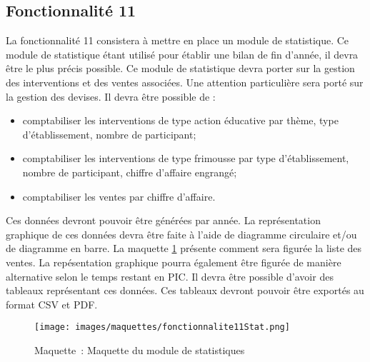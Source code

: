 
\subsection{Fonctionnalité 11}

La fonctionnalité 11 consistera à mettre en place un module de statistique. Ce module de statistique étant utilisé pour établir une bilan de fin d'année, il devra être le plus précis possible.
Ce module de statistique devra porter sur la gestion des interventions et des ventes associées.
Une attention particulière sera porté sur la gestion des devises.
Il devra être possible de :
\begin{itemize}
\item comptabiliser les interventions de type action éducative par thème, type d'établissement, nombre de participant;
\item comptabiliser les interventions de type frimousse par type d'établissement, nombre de participant, chiffre d'affaire engrangé;
\item comptabiliser les ventes par chiffre d'affaire.
\end{itemize}
Ces données devront pouvoir être générées par année. La représentation graphique de ces données devra être faite à l'aide de diagramme circulaire et/ou de diagramme en barre. La maquette \ref{fonctionnalite11Stat} présente comment sera figurée la liste des ventes. La repésentation graphique pourra également être figurée de manière alternative selon le temps restant en PIC.
Il devra être possible d'avoir des tableaux représentant ces données. Ces tableaux devront pouvoir être exportés au format CSV et PDF.

\begin{figure}[H]
	\centering
	\texttt{[image: images/maquettes/fonctionnalite11Stat.png]}
	 \caption{Maquette~: Maquette du module de statistiques}
	 \label{fonctionnalite11Stat}
\end{figure}
